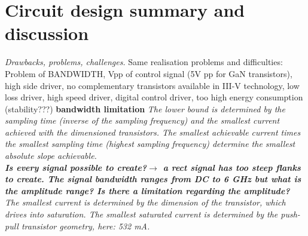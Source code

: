\section{Circuit design summary and discussion}
\textit{Drawbacks, problems, challenges.}
Same realisation problems and difficulties: Problem of BANDWIDTH, Vpp of control signal (5V pp for GaN transistors), high side driver, no complementary transistors available in III-V technology, low loss driver, high speed driver, digital control driver, too high energy consumption (stability???)
\textbf{bandwidth limitation}
\textit{The lower bound is determined by the sampling time (inverse of the sampling frequency) and the smallest current achieved with the dimensioned transistors.
 The smallest achievable current times the smallest sampling time (highest sampling frequency) determine the smallest absolute slope achievable. \\
 \textbf{Is every signal possible to create?$\rightarrow$ a rect signal has too steep flanks to create. The signal bandwidth ranges from DC to 6 GHz but what is the amplitude range? Is there a limitation regarding the amplitude?}
\\
The smallest current is determined by the dimension of the transistor, which drives into saturation. 
The smallest saturated current is determined by the push-pull transistor geometry, here: 532 mA.}